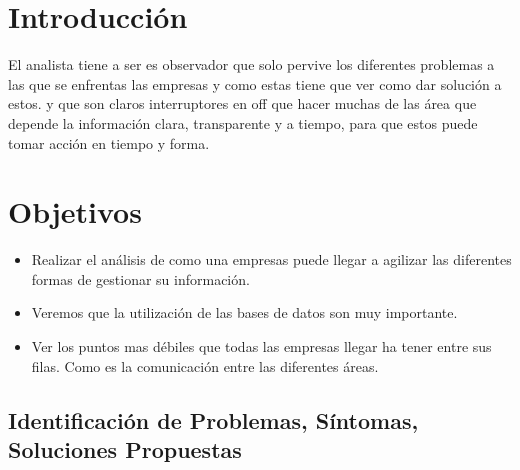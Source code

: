 \documentclass[12pt]{article}
\begin{document}
\newpage
\tableofcontents

\newpage
\section{ Introducción }
\vspace{1cm}

\begin{center}
\begin{minipage}{12cm}

  El analista tiene a ser es observador que solo pervive los diferentes 
  problemas a las que se enfrentas las empresas y como estas tiene que ver
  como dar solución a estos. y que son claros interruptores en off que 
  hacer muchas de las área que depende la información clara, transparente
  y a tiempo, para que estos puede tomar acción en tiempo y forma.

\end{minipage}
\end{center}

\newpage
\section{ Objetivos }
\vspace{1cm}

\begin{itemize}
  \item Realizar el análisis de como una empresas puede llegar a agilizar
    las diferentes formas de gestionar su información.
  \item Veremos que la utilización de las bases de datos son muy importante.
  \item Ver los puntos mas débiles que todas las empresas llegar ha tener 
    entre sus filas. Como es la comunicación entre las diferentes áreas.
\end{itemize}

\newpage

\begin{center}
\section{ 
Identificación de Problemas, Síntomas,
Soluciones Propuestas
}

\vspace{1cm}

\end{center}
\end{document}
